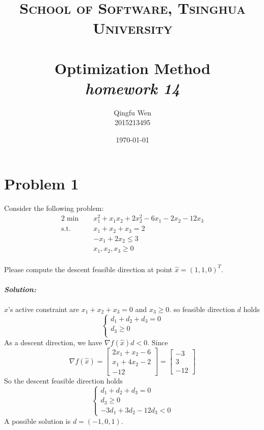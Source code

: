 \documentclass[paper=a4, fontsize=11pt]{scrartcl} %
\title{	
\normalfont \normalsize
\textsc{School of Software, Tsinghua University} \\ [25pt] %
\horrule{0.5pt} \\[0.4cm] %
\huge Optimization Method\\ %
\LARGE\textit{homework 14}
\horrule{2pt} \\[0.5cm] %
}
\author{Qingfu Wen \\ \normalsize 2015213495} %
\date{\normalsize\today} %
\numberwithin{equation}{section} %
\numberwithin{figure}{section} %
\numberwithin{table}{section} %
\begin{document}
\maketitle %
\tableofcontents
\newpage
\section{Problem 1}
Consider the following problem:
\begin{alignat}{2}          \nonumber
\min\quad & x_1^2+x_1x_2+2x_2^2-6x_1-2x_2-12x_3 \\    \nonumber
\mbox{s.t.}\quad            \nonumber
& x_1+x_2+x_3 = 2 \\    \nonumber
& -x_1+2x_2 \leq 3 \\     \nonumber
& x_1,x_2,x_3 \geq 0       \nonumber
\end{alignat}\\
Please compute the descent feasible direction at point $\hat{x}=(1,1,0)^T$.
\\~\\
\emph{\textbf{Solution:}}\\
~\\
$\hat{x}$'s active constraint are $x_1+x_2+x_3=0$ and $x_3\geq0$. so feasible direction $d$ holds
\begin{equation}
\left\{
\begin{aligned}
d_1+d_2+d_3 =0\\
d_3\geq0\\
\end{aligned}
\right. \nonumber
\end{equation}
As a descent direction, we have $\nabla f(\hat{x})d<0$. Since\\
\begin{equation} \nonumber
\nabla f(\hat{x}) = \begin{bmatrix}2x_1+x_2-6\\x_1+4x_2-2\\-12\end{bmatrix} = \begin{bmatrix}-3\\3\\-12\end{bmatrix}
\end{equation}
So the descent feasible direction holds 
\begin{equation}
\left\{
\begin{aligned}
d_1+d_2+d_3 =0\\
d_3\geq0\\
-3d_1+3d_2-12d_3 < 0
\end{aligned}
\right. \nonumber
\end{equation}
A possible solution is $d=(-1,0,1)$.
\end{document}
